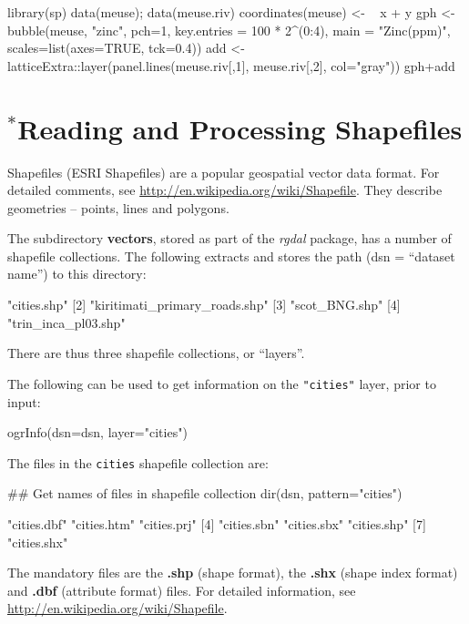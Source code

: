 \documentclass{tufte-book}\usepackage[]{graphicx}\usepackage[]{color}
\newcommand{\txtt}[1]{\texttt{#1}}
\begin{document}
\begin{Schunk}
\begin{Sinput}
library(sp)
data(meuse); data(meuse.riv)
coordinates(meuse) <- ~ x + y
gph <- bubble(meuse, "zinc", pch=1, key.entries =  100 * 2^(0:4),
              main = "Zinc(ppm)", scales=list(axes=TRUE, tck=0.4))
add <- latticeExtra::layer(panel.lines(meuse.riv[,1], meuse.riv[,2],
                      col="gray"))
gph+add
\end{Sinput}
\end{Schunk}

{\small
\section{$^*$Reading and Processing Shapefiles}
Shapefiles (ESRI Shapefiles) are a popular geospatial vector data
format.  For detailed comments, see
\url{http://en.wikipedia.org/wiki/Shapefile}.  They describe
geometries -- points, lines and polygons.

The subdirectory {\bf vectors}, stored as part of the {\em rgdal}
package, has a number of shapefile collections.  The following
extracts and stores the path (dsn = ``dataset name'') to this
directory:
\begin{Schunk}
\begin{Soutput}
[1] "cities.shp"                  
[2] "kiritimati_primary_roads.shp"
[3] "scot_BNG.shp"                
[4] "trin_inca_pl03.shp"          
\end{Soutput}
\end{Schunk}
\noindent
There are thus three shapefile collections, or ``layers''.
\begin{marginfigure}
  The following can be used to get information on the \txtt{"cities"}
layer, prior to input:
\begin{Schunk}
\begin{Sinput}
ogrInfo(dsn=dsn,
        layer="cities")
\end{Sinput}
\end{Schunk}
\end{marginfigure}

The files in the \txtt{cities} shapefile collection are:
\begin{Schunk}
\begin{Sinput}
## Get names of files in shapefile collection
dir(dsn, pattern="cities")
\end{Sinput}
\begin{Soutput}
[1] "cities.dbf" "cities.htm" "cities.prj"
[4] "cities.sbn" "cities.sbx" "cities.shp"
[7] "cities.shx"
\end{Soutput}
\end{Schunk}
The mandatory files are the {\bf .shp} (shape format), the {\bf .shx}
(shape index format) and {\bf .dbf} (attribute format) files.  For
  detailed information, see
  \url{http://en.wikipedia.org/wiki/Shapefile}.

}
\end{document}
